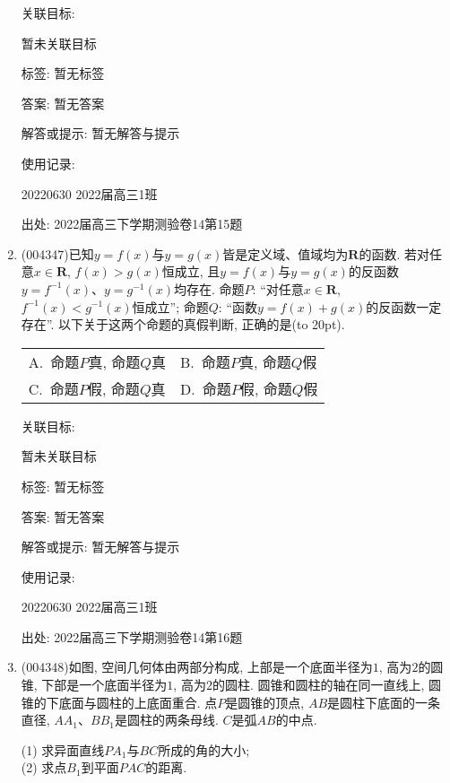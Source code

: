 \documentclass[10pt,a4paper]{article}
\newcommand{\bracket}[1]{(\hbox to #1pt{})}
\newcommand{\twoch}[4]{\par\begin{tabular}{p{.46\textwidth}p{.46\textwidth}}
A.~#1& B.~#2\\
C.~#3& D.~#4
\end{tabular}}
\begin{document}
\begin{enumerate}[1.]
关联目标:

暂未关联目标



标签: 暂无标签

答案: 暂无答案

解答或提示: 暂无解答与提示

使用记录:

20220630	2022届高三1班	


出处: 2022届高三下学期测验卷14第15题
\item { (004347)}已知$y=f(x)$与$y=g(x)$皆是定义域、值域均为$\mathbf{R}$的函数. 若对任意$x\in \mathbf{R}$, $f(x)>g(x)$恒成立, 且$y=f(x)$与$y=g(x)$的反函数$y=f^{-1}(x)$、$y=g^{-1}(x)$均存在. 命题$P$: ``对任意$x\in \mathbf{R}$, $f^{-1}(x)<g^{-1}(x)$恒成立''; 命题$Q$: ``函数$y=f(x)+g(x)$的反函数一定存在''. 以下关于这两个命题的真假判断, 正确的是\bracket{20}.
\twoch{命题$P$真, 命题$Q$真}{命题$P$真, 命题$Q$假
}{命题$P$假, 命题$Q$真}{命题$P$假, 命题$Q$假}


关联目标:

暂未关联目标



标签: 暂无标签

答案: 暂无答案

解答或提示: 暂无解答与提示

使用记录:

20220630	2022届高三1班	


出处: 2022届高三下学期测验卷14第16题
\item { (004348)}如图, 空间几何体由两部分构成, 上部是一个底面半径为$1$, 高为$2$的圆锥, 下部是一个底面半径为$1$, 高为$2$的圆柱. 圆锥和圆柱的轴在同一直线上, 圆锥的下底面与圆柱的上底面重合. 点$P$是圆锥的顶点, $AB$是圆柱下底面的一条直径, $AA_1$、$BB_1$是圆柱的两条母线. $C$是弧$AB$的中点.
\begin{center}
\end{center}
(1) 求异面直线$PA_1$与$BC$所成的角的大小;\\
(2) 求点$B_1$到平面$PAC$的距离.



\end{enumerate}
\end{document}
